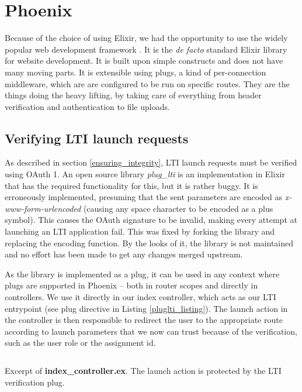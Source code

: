 \section{Phoenix}

Because of the choice of using Elixir, we had the opportunity to use the widely popular web development framework \cite{2018Phoenix}. It is the \emph{de facto} standard Elixir library for website development. It is built upon simple constructs and does not have many moving parts. It is extensible using plugs, a kind of per-connection middleware, which are are configured to be run on specific routes. They are the things doing the heavy lifting, by taking care of everything from header verification and authentication to file uploads.

\subsection{Verifying LTI launch requests}

As described in section \ref{ensuring_integrity}, LTI launch requests must be verified using OAuth 1. An open source library \emph{plug\_lti} is an implementation in Elixir that has the required functionality for this, but it is rather buggy. It is erroneously implemented, presuming that the sent parameters are encoded as \emph{x-www-form-urlencoded} (causing any space character to be encoded as a plus symbol). This causes the OAuth signature to be invalid, making every attempt at launching an LTI application fail. This was fixed by forking the library and replacing the encoding function. By the looks of it, the library is not maintained and no effort has been made to get any changes merged upstream.

As the library is implemented as a plug, it can be used in any context where plugs are supported in Phoenix -- both in router scopes and directly in controllers. We use it directly in our index controller, which acts as our LTI entrypoint (see plug directive in Listing \ref{pluglti_listing}). The launch action in the controller is then responsible to redirect the user to the appropriate route according to launch parameters that we now can trust because of the verification, such as the user role or the assignment id.

\begin{listing}
    \inputminted[firstline=8,lastline=27]{elixir}{code/server/lib/thesis_web/controllers/index_controller.ex}
    \caption{Excerpt of \textbf{index\_controller.ex}. The launch action is protected by the LTI verification plug.}
    \label{pluglti_listing}
\end{listing}

